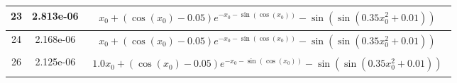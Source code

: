 \begin{center}
\begin{tabular}{|c|c|c|}
\hline23 & 2.813e-06 & $\begin{aligned}x_{0} + \left(\cos{\left(x_{0} \right)} - 0.05\right) e^{- x_{0} - \sin{\left(\cos{\left(x_{0} \right)} \right)}} - \sin{\left(\sin{\left(0.35 x_{0}^{2} + 0.01 \right)} \right)}\end{aligned}$\\ \hline24 & 2.168e-06 & $\begin{aligned}x_{0} + \left(\cos{\left(x_{0} \right)} - 0.05\right) e^{- x_{0} - \sin{\left(\cos{\left(x_{0} \right)} \right)}} - \sin{\left(\sin{\left(0.35 x_{0}^{2} + 0.01 \right)} \right)}\end{aligned}$\\ \hline26 & 2.125e-06 & $\begin{aligned}1.0 x_{0} + \left(\cos{\left(x_{0} \right)} - 0.05\right) e^{- x_{0} - \sin{\left(\cos{\left(x_{0} \right)} \right)}} - \sin{\left(\sin{\left(0.35 x_{0}^{2} + 0.01 \right)} \right)}\end{aligned}$\\ \hline\end{tabular}
        \end{center}
        